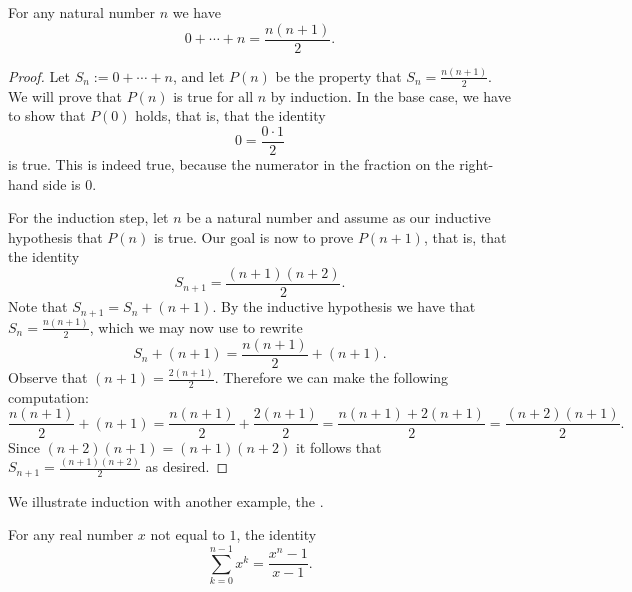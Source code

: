\begin{theorem}
  For any natural number $n$ we have
  \begin{equation*}
    0 + \cdots + n = \frac{n(n+1)}{2}.
  \end{equation*}
\end{theorem}

\begin{proof}
  Let $S_n:=0+\cdots+n$, and let $P(n)$ be the property that $S_n=\frac{n(n+1)}{2}$. We will prove that $P(n)$ is true for all $n$ by induction. In the base case, we have to show that $P(0)$ holds, that is, that the identity
  \begin{equation*}
    0=\frac{0\cdot 1}{2}
  \end{equation*}
  is true. This is indeed true, because the numerator in the fraction on the right-hand side is $0$.

  For the induction step, let $n$ be a natural number and assume as our inductive hypothesis that $P(n)$ is true. Our goal is now to prove $P(n+1)$, that is, that the identity
  \begin{equation*}
    S_{n+1}=\frac{(n+1)(n+2)}{2}.
  \end{equation*}
  Note that $S_{n+1}=S_n+(n+1)$. By the inductive hypothesis we have that $S_n=\frac{n(n+1)}{2}$, which we may now use to rewrite
  \begin{equation*}
    S_n + (n+1) = \frac{n(n+1)}{2} + (n+1).
  \end{equation*}
  Observe that $(n+1)=\frac{2(n+1)}{2}$. Therefore we can make the following computation:
  \begin{equation*}
    \frac{n(n+1)}{2} + (n+1) = \frac{n(n+1)}{2}+\frac{2(n+1)}{2} = \frac{n(n+1)+2(n+1)}{2}=\frac{(n+2)(n+1)}{2}.
  \end{equation*}
  Since $(n+2)(n+1)=(n+1)(n+2)$ it follows that $S_{n+1}=\frac{(n+1)(n+2)}{2}$ as desired.
\end{proof}

We illustrate induction with another example, the .

\begin{theorem}\label{theorem:formula-geometric-series}
  For any real number $x$ not equal to $1$, the identity
  \begin{equation*}
    \sum_{k=0}^{n-1}x^k = \frac{x^n-1}{x-1}.
  \end{equation*}
\end{theorem}

